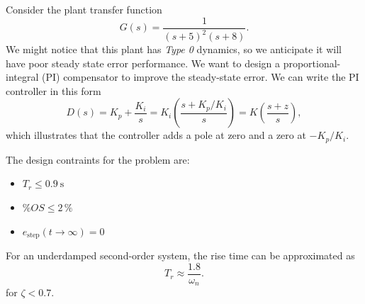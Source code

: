\documentclass[11pt]{article}
\begin{document}
Consider the plant transfer function
\[
G(s) = \frac{1}{(s+5)^2 (s+8)}.
\]
We might notice that this plant has \emph{Type 0} dynamics, so we anticipate it will have poor steady state error performance.
We want to design a proportional-integral (PI) compensator to improve the steady-state error.  We can write the PI controller in this form
\[
D(s) = K_p + \frac{K_i}{s} = K_i \left(\frac{s + K_p/K_i}{s}\right) = K \left(\frac{s+z}{s}\right),
\]
which illustrates that the controller adds a pole at zero and a zero at $-K_p/K_i$.

The design contraints for the problem are:
\begin{itemize}
\item $T_r \leq 0.9 \: \text{s}$
\item $\%OS \leq 2 \, \%$
\item $e_{\text{step}}(t \rightarrow \infty) = 0$
\end {itemize}


For an underdamped second-order system, the rise time can be approximated as
\[ T_r \approx \frac{1.8}{\omega_n}.
\]
for $\zeta < 0.7$.
\end{document}
